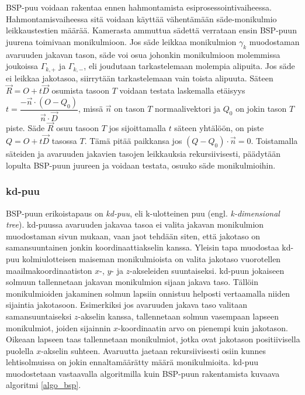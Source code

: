 \documentclass[a4paper, 12pt, titlepage]{article}
\begin{document}
BSP-puu voidaan rakentaa ennen hahmontamista esiprosessointivaiheessa. Hahmontamisvaiheessa sitä voidaan käyttää vähentämään säde-monikulmio leikkaustestien määrää. Kamerasta ammuttua sädettä verrataan ensin BSP-puun juurena toimivaan monikulmioon. Jos säde leikkaa monikulmion $\gamma_k$ muodostaman avaruuden jakavan tason, säde voi osua johonkin monikulmioon molemmissa joukoissa ${\Gamma_{k,+}}$ ja ${\Gamma_{k,-}}$, eli joudutaan tarkastelemaan molempia alipuita. Jos säde ei leikkaa jakotasoa, siirrytään tarkastelemaan vain toista alipuuta. Säteen $\vec{R}=O+t\vec{D}$ osumista tasoon $T$ voidaan testata laskemalla etäisyys $t=\dfrac{-\vec{n}\cdot(O-Q_0)}{\vec{n}\cdot\vec{D}}$, missä $\vec{n}$ on tason $T$ normaalivektori ja $Q_0$ on jokin tason $T$ piste. Säde $\vec{R}$ osuu tasoon $T$ jos sijoittamalla $t$ säteen yhtälöön, on piste $Q = O+t\vec{D}$ tasossa $T$. Tämä pitää paikkansa jos $(Q-Q_0)\cdot\vec{n} = 0$. \citep[.]{hughes} Toistamalla säteiden ja avaruuden jakavien tasojen leikkauksia rekursiivisesti, päädytään lopulta BSP-puun juureen ja voidaan testata, osuuko säde monikulmioihin. \citep[.]{ranta}\\

\subsubsection{kd-puu}

BSP-puun erikoistapaus on \emph{kd-puu}, eli k-ulotteinen puu (engl. \emph{k-dimensional tree}). 
kd-puussa avaruuden jakavaa tasoa ei valita jakavan monikulmion muodostaman sivun mukaan, vaan jaot tehdään siten, että jakotaso on samansuuntainen jonkin koordinaattiakselin kanssa. Yleisin tapa muodostaa kd-puu kolmiulotteisen maiseman monikulmioista on valita jakotaso vuorotellen maailmakoordinaatiston $x$-, $y$- ja $z$-akseleiden suuntaiseksi. kd-puun jokaiseen solmuun tallennetaan  
jakavan monikulmion sijaan jakava taso. Tällöin monikulmioiden jakaminen solmun lapsiin onnistuu helposti vertaamalla niiden sijaintia jakotasoon. Esimerkiksi jos avaruuden jakava taso valitaan samansuuntaiseksi $z$-akselin kanssa, tallennetaan solmun vasempaan lapseen monikulmiot, joiden sijainnin $x$-koordinaatin arvo on pienempi kuin jakotason. Oikeaan lapseen taas tallennetaan monikulmiot, jotka ovat jakotason positiivisella puolella $x$-akselin suhteen. \citep[.]{samet} Avaruutta jaetaan rekursiivisesti osiin kunnes lehtisolmuissa on jokin ennaltamäärätty määrä monikulmioita. kd-puu muodostetaan vastaavalla algoritmilla kuin BSP-puun rakentamista kuvaava algoritmi \ref{algo_bsp}.\\
\end{document}
